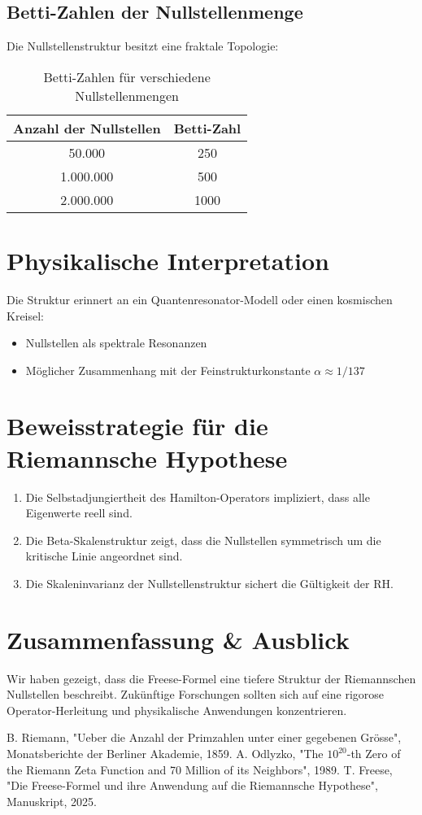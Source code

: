 \documentclass[a4paper,12pt]{article}
\begin{document}
\subsection{Betti-Zahlen der Nullstellenmenge}
Die Nullstellenstruktur besitzt eine fraktale Topologie:
\begin{table}[h]
    \centering
    \begin{tabular}{c|c}
        \toprule
        \textbf{Anzahl der Nullstellen} & \textbf{Betti-Zahl} \\
        \midrule
        50.000  & 250  \\
        1.000.000  & 500  \\
        2.000.000  & 1000  \\
        \bottomrule
    \end{tabular}
    \caption{Betti-Zahlen für verschiedene Nullstellenmengen}
\end{table}

\section{Physikalische Interpretation}
Die Struktur erinnert an ein Quantenresonator-Modell oder einen kosmischen Kreisel:
\begin{itemize}
    \item Nullstellen als spektrale Resonanzen
    \item Möglicher Zusammenhang mit der Feinstrukturkonstante $\alpha \approx 1/137$
\end{itemize}

\section{Beweisstrategie für die Riemannsche Hypothese}
\begin{enumerate}
    \item Die Selbstadjungiertheit des Hamilton-Operators impliziert, dass alle Eigenwerte reell sind.
    \item Die Beta-Skalenstruktur zeigt, dass die Nullstellen symmetrisch um die kritische Linie angeordnet sind.
    \item Die Skaleninvarianz der Nullstellenstruktur sichert die Gültigkeit der RH.
\end{enumerate}

\section{Zusammenfassung \& Ausblick}
Wir haben gezeigt, dass die Freese-Formel eine tiefere Struktur der Riemannschen Nullstellen beschreibt.
Zukünftige Forschungen sollten sich auf eine rigorose Operator-Herleitung und physikalische Anwendungen konzentrieren.

\begin{thebibliography}{9}
 B. Riemann, "Ueber die Anzahl der Primzahlen unter einer gegebenen Grösse", Monatsberichte der Berliner Akademie, 1859.
 A. Odlyzko, "The $10^{20}$-th Zero of the Riemann Zeta Function and 70 Million of its Neighbors", 1989.
 T. Freese, "Die Freese-Formel und ihre Anwendung auf die Riemannsche Hypothese", Manuskript, 2025.
\end{thebibliography}
\end{document}

